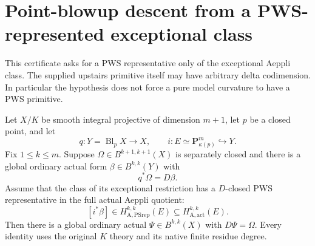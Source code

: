 \section{Point-blowup descent from a PWS-represented exceptional class}
\label{r15pc:section}

This certificate asks for a PWS representative only of the
exceptional Aeppli class.  The supplied upstairs primitive
itself may have arbitrary delta codimension.  In particular
the hypothesis does not force a pure model curvature to have
a PWS primitive.

\begin{theorem}
\label{r15pc:point-certificate}
Let $X/K$ be smooth integral projective of dimension $m+1$,
let $p$ be a closed point, and let
\[
 q:Y=\operatorname{Bl}_pX\longrightarrow X,
 \qquad i:E\simeq\mathbf P^m_{\kappa(p)}\hookrightarrow Y.
\]
Fix $1\leq k\leq m$.  Suppose
$\Omega\in B^{k+1,k+1}(X)$ is separately closed and there
is a global ordinary actual form $\beta\in B^{k,k}(Y)$ with
\[
                             q^*\Omega=D\beta.
\tag{EP15.1}\label{r15pc:upstairs}
\]
Assume that the class of its exceptional restriction has
a $D$-closed PWS representative in the full actual Aeppli
quotient:
\[
 [i^*\beta]\in
 H_{\mathrm A,\mathrm{PSrep}}^{k,k}(E)
       \subseteq H_{\mathrm A,\mathrm{act}}^{k,k}(E).
\tag{EP15.2}\label{r15pc:exceptional-hypothesis}
\]
Then there is a global ordinary actual
$\Psi\in B^{k,k}(X)$ with $D\Psi=\Omega$.
Every identity uses the original $K$ theory and its native
finite residue degree.
\end{theorem}

